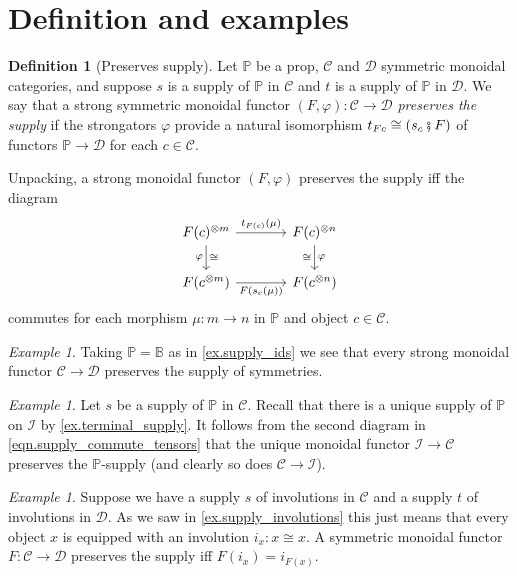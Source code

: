 \documentclass[11pt, oneside, article]{memoir}
\theoremstyle{plain}
\theoremstyle{definition}
\newtheorem{definition}[theorem]{Definition}
\theoremstyle{remark}
\newtheorem{example}[theorem]{Example}
\newcommand{\cat}[1]{\mathcal{#1}}%
\newcommand{\tpow}[1]{^{\otimes #1}}
\newcommand{\bij}{\bb}
\renewcommand{\aa}{\mathbb{A}} %
\newcommand{\bb}{\mathbb{B}} %
\newcommand{\pp}{\mathbb{P}}
\newcommand{\zero}{\cat{I}}
\newcommand{\cp}{\mathbin{\fatsemi}}
\begin{document}
\section{Definition and examples}\label{sec.pres_supply}

\begin{definition}[Preserves supply]\label{def.preserve_supply}
Let $\pp$ be a prop, $\cat{C}$ and $\cat{D}$ symmetric monoidal categories, and suppose $s$ is a supply of $\pp$ in $\cat{C}$ and $t$ is a supply of $\pp$ in $\cat{D}$. We say that a strong symmetric monoidal functor $(F,\varphi)\colon\cat{C}\to\cat{D}$ \emph{preserves the supply} if the strongators $\varphi$ provide a natural isomorphism $t_{Fc}\cong (s_c\cp F)$ of functors $\pp\to\cat{D}$ for each $c\in\cat{C}$.
\end{definition}

Unpacking, a strong monoidal functor $(F,\varphi)$ preserves the supply iff the diagram
\begin{equation}\label{eqn.unpack_preserve_supply}
	\begin{tikzcd}[column sep=large]
  	F(c)\tpow{m}\ar[r, "t_{F(c)}(\mu)"]\ar[d, "\varphi"', "\cong"]&
  	F(c)\tpow{n}\ar[d, "\varphi", "\cong"']\\
  	F(c\tpow{m})\ar[r, "F(s_c(\mu))"']&
  	F(c\tpow{n})
  \end{tikzcd}
\end{equation}
commutes for each morphism $\mu\colon m\to n$ in $\pp$ and object $c\in\cat{C}$.

\begin{example}
Taking $\pp=\bij$ as in \cref{ex.supply_ids} we see that every strong monoidal functor $\cat{C}\to\cat{D}$ preserves the supply of symmetries.
\end{example}

\begin{example}
Let $s$ be a supply of $\pp$ in $\cat{C}$. Recall that there is a unique supply of $\pp$ on $\zero$ by \cref{ex.terminal_supply}. It follows from the second diagram in \cref{eqn.supply_commute_tensors} that the unique monoidal functor $\zero\to\cat{C}$ preserves the $\pp$-supply (and clearly so does $\cat{C}\to\zero$).
\end{example}

\begin{example}\label{ex.preserve_involutions}
Suppose we have a supply $s$ of involutions in $\cat{C}$ and a supply $t$ of involutions in $\cat{D}$. As we saw in \cref{ex.supply_involutions} this just means that every object $x$ is equipped with an involution $i_x\colon x\cong x$. A symmetric monoidal functor $F\colon\cat{C}\to\cat{D}$ preserves the supply iff $F(i_x)=i_{F(x)}$.
\end{example}
\end{document}
